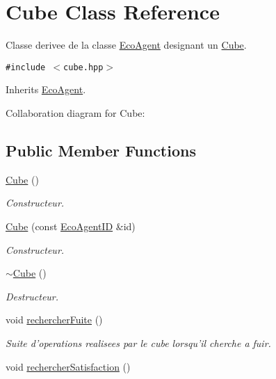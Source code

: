 \hypertarget{classCube}{
\section{Cube Class Reference}
\label{classCube}
}
Classe derivee de la classe \hyperlink{classEcoAgent}{EcoAgent} designant un \hyperlink{classCube}{Cube}.  


{\tt \#include $<$cube.hpp$>$}

Inherits \hyperlink{classEcoAgent}{EcoAgent}.

Collaboration diagram for Cube:\subsection*{Public Member Functions}
\begin{CompactItemize}
\item 
\hyperlink{classCube_06f3d86fb63e3aad08623610aa3c17b4}{Cube} ()
\begin{CompactList}\small\item\em Constructeur. \item\end{CompactList}\item 
\hyperlink{classCube_4793068a114fd49b51233e8f81884189}{Cube} (const \hyperlink{classEcoAgentID}{EcoAgentID} \&id)
\begin{CompactList}\small\item\em Constructeur. \item\end{CompactList}\item 
\hyperlink{classCube_a814e979cecb8c451fdb332ded2cea1e}{$\sim$Cube} ()
\begin{CompactList}\small\item\em Destructeur. \item\end{CompactList}\item 
\hypertarget{classCube_c81ac3b8da58ba8463d72e3a0433bafa}{
void \hyperlink{classCube_c81ac3b8da58ba8463d72e3a0433bafa}{rechercherFuite} ()}
\label{classCube_c81ac3b8da58ba8463d72e3a0433bafa}

\begin{CompactList}\small\item\em Suite d'operations realisees par le cube lorsqu'il cherche a fuir. \item\end{CompactList}\item 
\hypertarget{classCube_10f69d54f313f48ac0c8468628ac6902}{
void \hyperlink{classCube_10f69d54f313f48ac0c8468628ac6902}{rechercherSatisfaction} ()}
\label{classCube_10f69d54f313f48ac0c8468628ac6902}


\end{CompactItemize}
